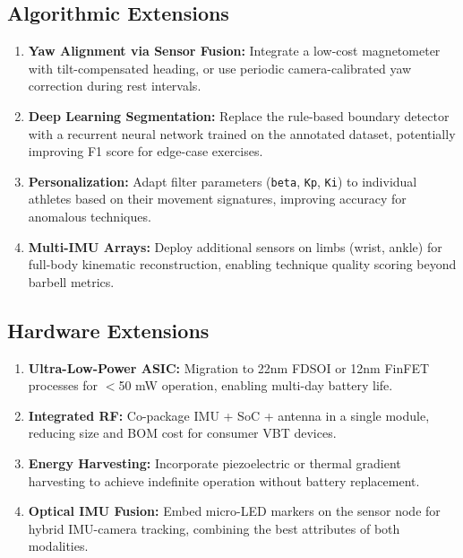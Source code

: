 \subsection{Algorithmic Extensions}

\begin{enumerate}
    \item \textbf{Yaw Alignment via Sensor Fusion:} Integrate a low-cost magnetometer with tilt-compensated heading, or use periodic camera-calibrated yaw correction during rest intervals.

    \item \textbf{Deep Learning Segmentation:} Replace the rule-based boundary detector with a recurrent neural network trained on the annotated dataset, potentially improving F1 score for edge-case exercises.

    \item \textbf{Personalization:} Adapt filter parameters (\texttt{beta}, \texttt{Kp}, \texttt{Ki}) to individual athletes based on their movement signatures, improving accuracy for anomalous techniques.

    \item \textbf{Multi-IMU Arrays:} Deploy additional sensors on limbs (wrist, ankle) for full-body kinematic reconstruction, enabling technique quality scoring beyond barbell metrics.
\end{enumerate}

\subsection{Hardware Extensions}

\begin{enumerate}
    \item \textbf{Ultra-Low-Power ASIC:} Migration to 22nm FDSOI or 12nm FinFET processes for $<$50 mW operation, enabling multi-day battery life.

    \item \textbf{Integrated RF:} Co-package IMU + SoC + antenna in a single module, reducing size and BOM cost for consumer VBT devices.

    \item \textbf{Energy Harvesting:} Incorporate piezoelectric or thermal gradient harvesting to achieve indefinite operation without battery replacement.

    \item \textbf{Optical IMU Fusion:} Embed micro-LED markers on the sensor node for hybrid IMU-camera tracking, combining the best attributes of both modalities.
\end{enumerate}

